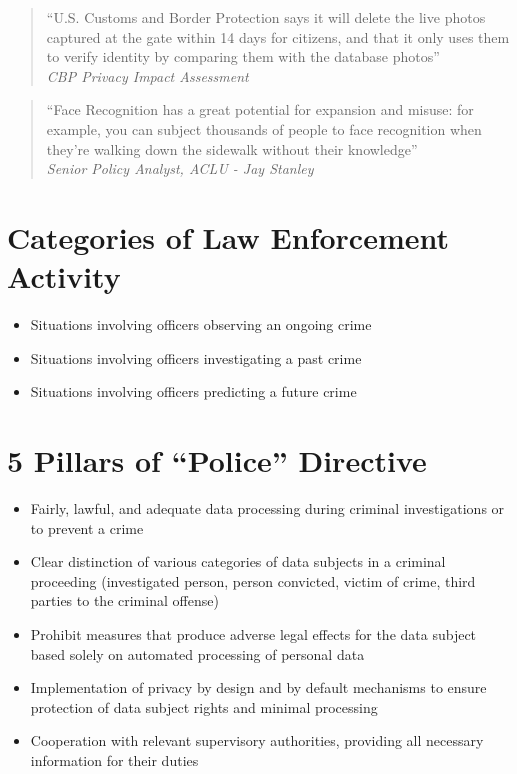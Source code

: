 \begin{multicols}{2}
    \begin{quote}
        “U.S. Customs and Border Protection says it will delete the live photos captured at the gate within 14 days for citizens, and that it only uses them to verify identity by comparing them with the database photos”  \\
        \textit{CBP Privacy Impact Assessment}
    \end{quote}

    \begin{quote}
        “Face Recognition has a great potential for expansion and misuse: for example, you can subject thousands of people to face recognition when they’re walking down the sidewalk without their knowledge”  \\
        \textit{Senior Policy Analyst, ACLU - Jay Stanley}
    \end{quote}
\end{multicols}

\section{Categories of Law Enforcement Activity}

\begin{itemize}[itemsep=0pt]
    \item Situations involving officers observing an ongoing crime
    \item Situations involving officers investigating a past crime
    \item Situations involving officers predicting a future crime
\end{itemize}

\section{5 Pillars of “Police” Directive}

\begin{itemize}[itemsep=0pt]
    \item Fairly, lawful, and adequate data processing during criminal investigations or to prevent a crime
    \item Clear distinction of various categories of data subjects in a criminal proceeding (investigated person, person convicted, victim of crime, third parties to the criminal offense)
    \item Prohibit measures that produce adverse legal effects for the data subject based solely on automated processing of personal data
    \item Implementation of privacy by design and by default mechanisms to ensure protection of data subject rights and minimal processing
    \item Cooperation with relevant supervisory authorities, providing all necessary information for their duties
\end{itemize}

